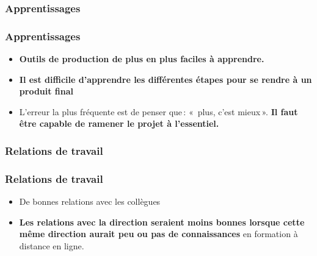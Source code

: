					\subsubsection{Apprentissages} 
						\begin{frame}[allowframebreaks]
						\frametitle{Apprentissages}
                        			 
                        			\begin{itemize}
                        			\item \textbf{Outils de production de plus en plus faciles à apprendre. }
                        			\item \textbf{Il est difficile d'apprendre les différentes étapes pour se rendre à un produit final}
                        			\item L’erreur la plus fréquente est de penser que\,: «\, plus, c’est mieux\,». \textbf{Il faut être capable de ramener le projet à l’essentiel.}

                        				
						\end{itemize}
						\end{frame}	
						
					\subsubsection{Relations de travail} 
						\begin{frame}[allowframebreaks]
						\frametitle{Relations de travail}
                        			\begin{itemize}
                        			\item De bonnes relations avec les collègues
                        			\item \textbf{Les relations avec la direction seraient moins bonnes lorsque cette même direction aurait peu ou pas de connaissances} en formation à distance en ligne.

                        				
						\end{itemize}
						\end{frame}	
						

